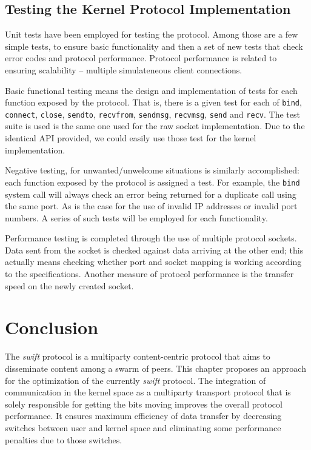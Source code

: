 \subsection{Testing the Kernel Protocol Implementation}

Unit tests have been employed for testing the protocol. Among those are a few
simple tests, to ensure basic functionality and then a set of new tests that
check error codes and protocol performance. Protocol performance is related to
ensuring scalability -- multiple simulateneous client connections.

Basic functional testing means the design and implementation of tests for each
function exposed by the protocol. That is, there is a given test for each of
\texttt{bind}, \texttt{connect}, \texttt{close}, \texttt{sendto},
\texttt{recvfrom}, \texttt{sendmsg}, \texttt{recvmsg}, \texttt{send} and
\texttt{recv}. The test suite is used is the same one used for the raw
socket implementation. Due to the identical API provided, we could easily use
those test for the kernel implementation.

Negative testing, for unwanted/unwelcome situations is similarly accomplished:
each function exposed by the protocol is assigned a test. For example, the
\texttt{bind} system call will always check an error being returned for a
duplicate call using the same port. As is the case for the use of invalid IP
addresses or invalid port numbers. A series of such tests will be employed for
each functionality.

Performance testing is completed through the use of multiple protocol sockets.
Data sent from the socket is checked against data arriving at the other
end; this actually means checking whether port and socket mapping is working
according to the specifications. Another measure of protocol performance is
the transfer speed on the newly created socket.

\section{Conclusion}
\label{sec:multiparty:conclusion}

The \textit{swift} protocol is a multiparty content-centric protocol that aims
to disseminate content among a swarm of peers. This chapter proposes an
approach for the optimization of the currently \textit{swift} protocol. The
integration of communication in the kernel space as a multiparty transport
protocol that is solely responsible for getting the bits moving improves the
overall protocol performance. It ensures maximum efficiency of data transfer
by decreasing switches between user and kernel space and eliminating some
performance penalties due to those switches.

